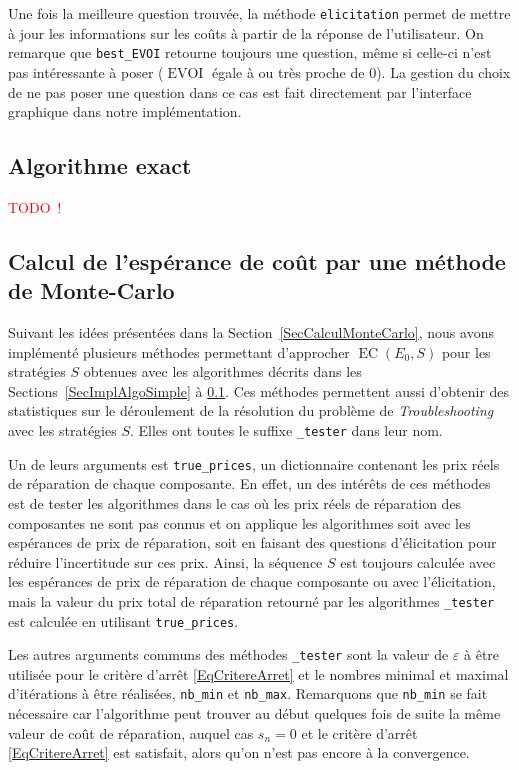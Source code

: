 \documentclass[a4paper,11pt]{article}
\theoremstyle{plain}
\theoremstyle{definition}
\DeclareMathOperator{\EC}{EC}
\DeclareMathOperator{\EVOI}{EVOI}
\begin{document}
Une fois la meilleure question trouvée, la méthode \texttt{elicitation} permet de mettre à jour les informations sur les coûts à partir de la réponse de l'utilisateur. On remarque que \texttt{best\_EVOI} retourne toujours une question, même si celle-ci n'est pas intéressante à poser ($\EVOI$ égale à ou très proche de $0$). La gestion du choix de ne pas poser une question dans ce cas est fait directement par l'interface graphique dans notre implémentation.

\subsection{Algorithme exact}
\label{SecImplExact}

\textcolor{red}{TODO~!}

\subsection{Calcul de l'espérance de coût par une méthode de Monte-Carlo}
\label{SecImplMC}

Suivant les idées présentées dans la Section~\ref{SecCalculMonteCarlo}, nous avons implémenté plusieurs méthodes permettant d'approcher $\EC(E_0, S)$ pour les stratégies $S$ obtenues avec les algorithmes décrits dans les Sections~\ref{SecImplAlgoSimple} à \ref{SecImplExact}. Ces méthodes permettent aussi d'obtenir des statistiques sur le déroulement de la résolution du problème de \emph{Troubleshooting} avec les stratégies $S$. Elles ont toutes le suffixe \texttt{\_tester} dans leur nom.

Un de leurs arguments est \texttt{true\_prices}, un dictionnaire contenant les prix réels de réparation de chaque composante. En effet, un des intérêts de ces méthodes est de tester les algorithmes dans le cas où les prix réels de réparation des composantes ne sont pas connus et on applique les algorithmes soit avec les espérances de prix de réparation, soit en faisant des questions d'élicitation pour réduire l'incertitude sur ces prix. Ainsi, la séquence $S$ est toujours calculée avec les espérances de prix de réparation de chaque composante ou avec l'élicitation, mais la valeur du prix total de réparation retourné par les algorithmes \texttt{\_tester} est calculée en utilisant \texttt{true\_prices}.

Les autres arguments communs des méthodes \texttt{\_tester} sont la valeur de $\varepsilon$ à être utilisée pour le critère d'arrêt \eqref{EqCritereArret} et le nombres minimal et maximal d'itérations à être réalisées, \texttt{nb\_min} et \texttt{nb\_max}. Remarquons que \texttt{nb\_min} se fait nécessaire car l'algorithme peut trouver au début quelques fois de suite la même valeur de coût de réparation, auquel cas $s_n = 0$ et le critère d'arrêt \eqref{EqCritereArret} est satisfait, alors qu'on n'est pas encore à la convergence.
\end{document}

